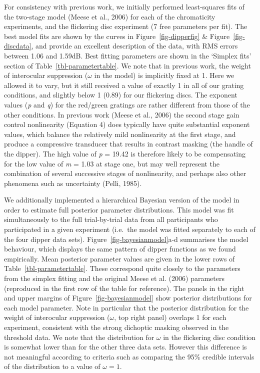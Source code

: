 \documentclass[
  letterpaper,
  DIV=11,
  numbers=noendperiod]{scrartcl}
\begin{document}
For consistency with previous work, we initially performed least-squares
fits of the two-stage model (Meese et al., 2006) for each of the
chromaticity experiments, and the flickering disc experiment (7 free
parameters per fit). The best model fits are shown by the curves in
Figure~\ref{fig-dipperfig} \& Figure~\ref{fig-discdata}, and provide an
excellent description of the data, with RMS errors between 1.06 and
1.59dB. Best fitting parameters are shown in the `Simplex fits' section
of Table~\ref{tbl-parametertable}. We note that in previous work, the
weight of interocular suppression (\(\omega\) in the model) is
implicitly fixed at 1. Here we allowed it to vary, but it still received
a value of exactly 1 in all of our grating conditions, and slightly
below 1 (0.89) for our flickering discs. The exponent values (\emph{p}
and \emph{q}) for the red/green gratings are rather different from those
of the other conditions. In previous work (Meese et al., 2006) the
second stage gain control nonlinearity (Equation 4) does typically have
quite substantial exponent values, which balance the relatively mild
nonlinearity at the first stage, and produce a compressive transducer
that results in contrast masking (the handle of the dipper). The high
value of \emph{p} = 19.42 is therefore likely to be compensating for the
low value of \emph{m} = 1.03 at stage one, but may well represent the
combination of several successive stages of nonlinearity, and perhaps
also other phenomena such as uncertainty (Pelli, 1985).

We additionally implemented a hierarchical Bayesian version of the model
in order to estimate full posterior parameter distributions. This model
was fit simultaneously to the full trial-by-trial data from all
participants who participated in a given experiment (i.e.~the model was
fitted separately to each of the four dipper data sets).
Figure~\ref{fig-bayesianmodel}a-d summarises the model behaviour, which
displays the same pattern of dipper functions as we found empirically.
Mean posterior parameter values are given in the lower rows of
Table~\ref{tbl-parametertable}. These correspond quite closely to the
parameters from the simplex fitting and the original Meese et al. (2006)
parameters (reproduced in the first row of the table for reference). The
panels in the right and upper margins of Figure~\ref{fig-bayesianmodel}
show posterior distributions for each model parameter. Note in
particular that the posterior distribution for the weight of interocular
suppression (\(\omega\), top right panel) overlaps 1 for each
experiment, consistent with the strong dichoptic masking observed in the
threshold data. We note that the distribution for \(\omega\) in the
flickering disc condition is somewhat lower than for the other three
data sets. However this difference is not meaningful according to
criteria such as comparing the 95\% credible intervals of the
distribution to a value of \(\omega=1\).
\end{document}
